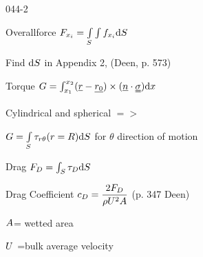 \begin{mitframe}{044-2}
\begin{listone}
	\item \item Overallforce $\force_{\specfrac{i}}=\int\limits_{\entropy}\int\nolimits\fug_{\specfrac{i}}\mathrm{d}\entropy$
    \item Find $\mathrm{d}\entropy$ in Appendix 2, (Deen, p. 573)
    \item Torque $\gibbs=\int_{\disp_1}^{\disp_2}(\uline{\pos}-\uline{\pos_{0}})\times(\normvec\cdot\stresstens)\mathrm{d}\disp$
    		\begin{listtwo}
            		\item Cylindrical and spherical $=>$
                    \item $\gibbs=\int\limits_{\entropy}\torque_{\pos\theta}(\pos=\gasconst)\mathrm{d}\entropy$ for $\theta$ direction of motion
            \end{listtwo}

\item Drag $\force_{\elecdisplace}=\int_{\entropy}\torque_{\elecdisplace}\mathrm{d}\entropy$
\item Drag Coefficient $\dragcoeff=\dfrac{2\force_{\elecdisplace}}{\dens\uvel^2\helmholtz}$ (p. 347 Deen)
			\begin{listtwo}
            	\item $\helmholtz$= wetted area
                \item $\uvel$ =bulk average velocity
            \end{listtwo}
\end{listone}
\end{mitframe}